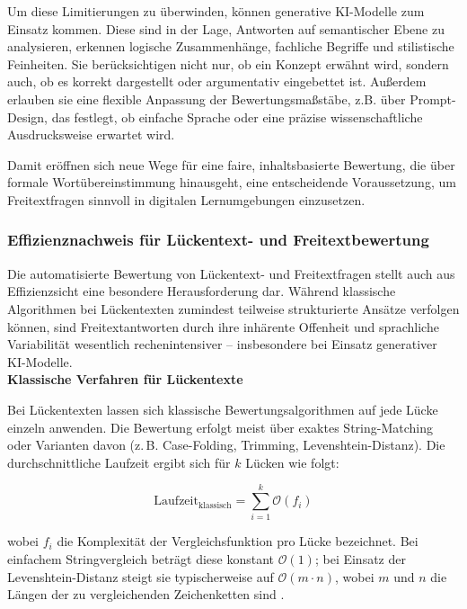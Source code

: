 \documentclass[a4paper,12pt]{article}
\begin{document}
Um diese Limitierungen zu überwinden, können generative KI-Modelle zum Einsatz kommen. Diese sind in der Lage, Antworten auf semantischer Ebene zu analysieren, erkennen logische Zusammenhänge, fachliche Begriffe und stilistische Feinheiten. Sie berücksichtigen nicht nur, ob ein Konzept erwähnt wird, sondern auch, ob es korrekt dargestellt oder argumentativ eingebettet ist. Außerdem erlauben sie eine flexible Anpassung der Bewertungsmaßstäbe, z.B. über Prompt-Design, das festlegt, ob einfache Sprache oder eine präzise wissenschaftliche Ausdrucksweise erwartet wird.

Damit eröffnen sich neue Wege für eine faire, inhaltsbasierte Bewertung, die über formale Wortübereinstimmung hinausgeht, eine entscheidende Voraussetzung, um Freitextfragen sinnvoll in digitalen Lernumgebungen einzusetzen.

\subsubsection{Effizienznachweis für Lückentext- und Freitextbewertung}

Die automatisierte Bewertung von Lückentext- und Freitextfragen stellt auch aus Effizienzsicht eine besondere Herausforderung dar. Während klassische Algorithmen bei Lückentexten zumindest teilweise strukturierte Ansätze verfolgen können, sind Freitextantworten durch ihre inhärente Offenheit und sprachliche Variabilität wesentlich rechenintensiver – insbesondere bei Einsatz generativer KI-Modelle.\\



\textbf{Klassische Verfahren für Lückentexte}  

Bei Lückentexten lassen sich klassische Bewertungsalgorithmen auf jede Lücke einzeln anwenden. Die Bewertung erfolgt meist über exaktes String-Matching oder Varianten davon (z.\,B. Case-Folding, Trimming, Levenshtein-Distanz). Die durchschnittliche Laufzeit ergibt sich für $k$ Lücken wie folgt:

\[
\text{Laufzeit}_{\text{klassisch}} = \sum_{i=1}^{k} \mathcal{O}(f_i)
\]

wobei $f_i$ die Komplexität der Vergleichsfunktion pro Lücke bezeichnet.  
Bei einfachem Stringvergleich beträgt diese konstant \(\mathcal{O}(1)\); bei Einsatz der Levenshtein-Distanz steigt sie typischerweise auf \(\mathcal{O}(m \cdot n)\), wobei \(m\) und \(n\) die Längen der zu vergleichenden Zeichenketten sind \parencite[S. 985]{cormen}.\\
\end{document}

